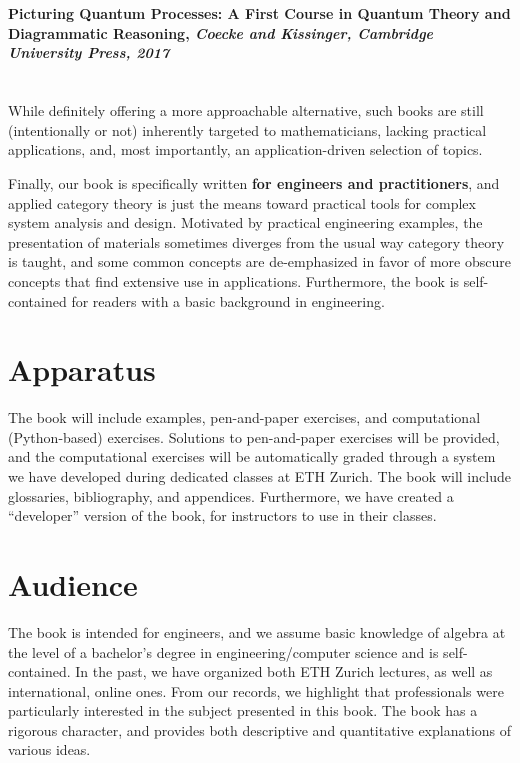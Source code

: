 \documentclass[10pt, article, one side]{memoir}
\begin{document}
    \
    \\

    \paragraph{Picturing Quantum Processes: A First Course in Quantum Theory and Diagrammatic Reasoning, \emph{Coecke and Kissinger, Cambridge University Press, 2017}}

    \
    \\

    While definitely offering a more approachable alternative, such books are still (intentionally or not) inherently targeted to mathematicians, lacking practical applications, and, most importantly, an application-driven selection of topics.

    Finally, our book is specifically written \textbf{for engineers and practitioners}, and applied category theory is just the means toward practical tools for complex system analysis and design.
    Motivated by practical engineering examples, the presentation of materials sometimes diverges from the usual way category theory is taught, and some common concepts are de-emphasized in favor of more obscure concepts that find extensive use in applications.
    Furthermore, the book is self-contained for readers with a basic background in engineering.

    \section{Apparatus}
    The book will include examples, pen-and-paper exercises, and computational (Python-based) exercises.
    Solutions to pen-and-paper exercises will be provided, and the computational exercises will be automatically graded through a system we have developed during dedicated classes at ETH Zurich.
    The book will include glossaries, bibliography, and appendices.
    Furthermore, we have created a “developer” version of the book, for instructors to use in their classes.

    \section{Audience}
    The book is intended for engineers, and we assume basic knowledge of algebra at the level of a bachelor’s degree in engineering/computer science and is self-contained.
    In the past, we have organized both ETH Zurich lectures, as well as international, online ones.
    From our records, we highlight that professionals were particularly interested in the subject presented in this book.
    The book has a rigorous character, and provides both descriptive and quantitative explanations of various ideas.
\end{document}
